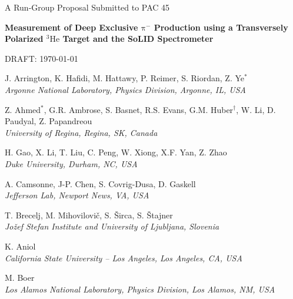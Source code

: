 \documentclass{article}
\begin{document}

\begin{center}

{\Huge A Run-Group Proposal Submitted to PAC 45}

\vspace*{25pt}

{\LARGE\bf
Measurement of Deep Exclusive $\mathrm\pi^-$ Production
using a Transversely Polarized $\mathrm{^{3}He}$ Target
and the SoLID Spectrometer}

\vspace*{3ex}
DRAFT: \today

\vspace*{30pt}

J. Arrington, K. Hafidi, M. Hattawy, P. Reimer, S. Riordan, Z. Ye$^\ast$ \\
{\it Argonne National Laboratory, Physics Division, Argonne, IL, USA}
\vspace*{15pt}

Z. Ahmed$^\ast$, G.R. Ambrose, S. Basnet, R.S. Evans, G.M. Huber$^\dagger$,
W. Li, D. Paudyal, Z. Papandreou\\
{\it University of Regina, Regina, SK, Canada}
\vspace*{15pt}

H. Gao, X. Li, T. Liu, C. Peng, W. Xiong, X.F. Yan, Z. Zhao\\
{\it Duke University, Durham, NC, USA}
\vspace*{15pt}

A. Camsonne,  J-P. Chen, S. Covrig-Dusa, D. Gaskell\\
{\it  Jefferson Lab, Newport News, VA, USA}
\vspace*{15pt}

T. Brecelj, M. Mihovilovi\v{c}, S. \v{S}irca, S. \v{S}tajner\\
{\it Jo\v{z}ef Stefan Institute and University of Ljubljana, Slovenia}
\vspace*{15pt}

K. Aniol\\
{\it California State University -- Los Angeles, Los Angeles, CA, USA}
\vspace*{15pt}

M. Boer\\
{\it Los Alamos National Laboratory, Physics Division, Los Alamos, NM, USA}
\vspace*{15pt}


\end{center}
\end{document}
